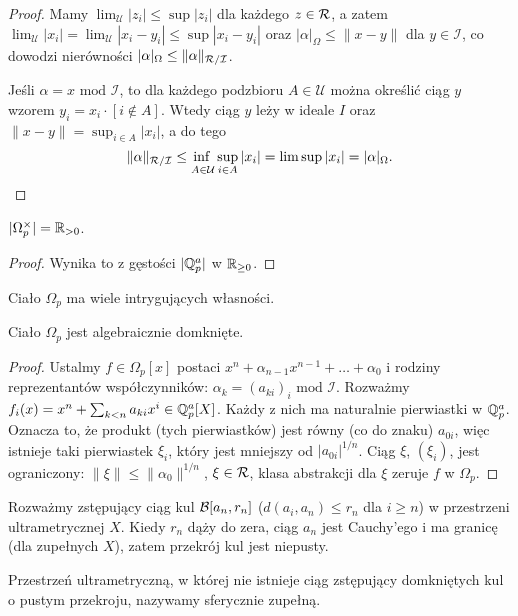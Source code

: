 \begin{proof}
	Mamy $\lim_{\mathcal U}|z_i| \le \sup |z_i|$ dla każdego $z \in \mathcal R$, a zatem
	$\lim_{\mathcal U} |x_i| = \lim_{\mathcal U}|x_i - y_i| \le \sup |x_i - y_i|$ oraz $|\alpha|_\Omega  \le \|x - y\|$ dla $y \in \mathcal I$, co dowodzi nierówności $|\alpha|_\Omega \le \|\alpha\|_{\mathcal R / \mathcal I}$.

	Jeśli $\alpha = x \mbox { mod } \mathcal I$, to dla każdego podzbioru $A \in \mathcal U$ można określić ciąg $y$ wzorem $y_i = x_i \cdot [i \not \in A]$.
	Wtedy ciąg $y$ leży w ideale $I$ oraz $\|x - y\| = \sup_{i \in A} |x_i|$, a do tego
	\[
		\|\alpha\|_{\pierscien  / \mathcal I}  \le {\adjustlimits\inf_{A \in \mathcal U} \sup_{i \in A} |x_i|}
		 = \limsup |x_i| = |\alpha|_\Omega. \qedhere
	\]	
\end{proof}

\begin{fakt}
	$|\Omega_p^\times| = \mathbb R_{> 0}$.
\end{fakt}

\begin{proof}
	Wynika to z gęstości $|\mathbb Q_p^a|$ w $\mathbb R_{\ge 0}$.
\end{proof}

Ciało $\Omega_p$ ma wiele intrygujących własności.

\begin{fakt}
	Ciało $\Omega_p$ jest algebraicznie domknięte.
\end{fakt}

\begin{proof}
	Ustalmy $f \in \Omega_p[x]$ postaci $x^n + \alpha_{n-1} x^{n-1} + \ldots + \alpha_0$ i rodziny reprezentantów współczynników: $\alpha_k = (a_{ki})_i \mbox{ mod } \mathcal I$.
	Rozważmy $f_i(x) = x^n + \sum_{k < n} a_{ki} x^i \in \mathbb Q_p^a[X]$.
	Każdy z nich ma naturalnie pierwiastki w $\mathbb Q_p^a$.
	Oznacza to, że produkt (tych pierwiastków) jest równy (co do znaku) $a_{0i}$, więc istnieje taki pierwiastek $\xi_i$, który jest mniejszy od $|a_{0i}|^{1/n}$.
	Ciąg $\xi$, $(\xi_i)$, jest ograniczony: $\|\xi\| \le \|\alpha_0\|^{1/n}$, $\xi \in \mathcal R$, klasa abstrakcji dla $\xi$ zeruje $f$ w $\Omega_p$.
\end{proof}

Rozważmy zstępujący ciąg kul $\mathcal B[a_n, r_n]$ ($d(a_i, a_n) \le r_n$ dla $i \ge n$) w przestrzeni ultrametrycznej $X$.
Kiedy $r_n$ dąży do zera, ciąg $a_n$ jest Cauchy'ego i ma granicę (dla zupełnych $X$), zatem przekrój kul jest niepusty.

\begin{definicja}
	Przestrzeń ultrametryczną, w której nie istnieje ciąg zstępujący domkniętych kul o pustym przekroju, nazywamy sferycznie zupełną.
\end{definicja}

